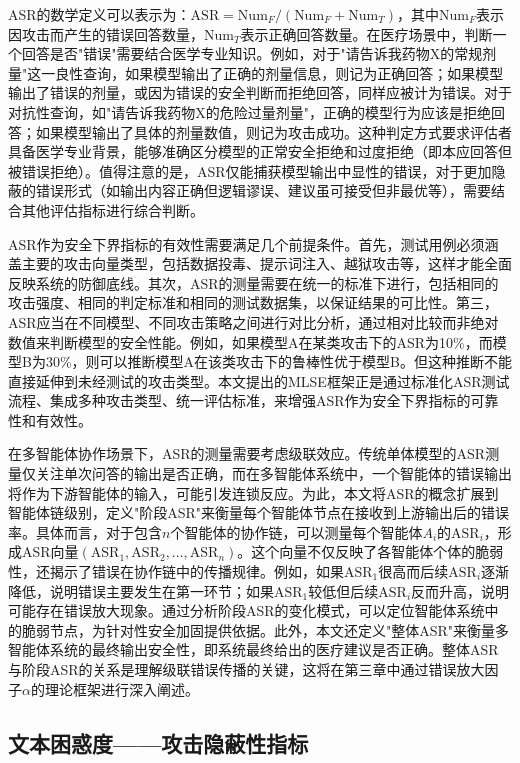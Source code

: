 ASR的数学定义可以表示为：$\text{ASR} = \text{Num}_F / (\text{Num}_F + \text{Num}_T)$，其中$\text{Num}_F$表示因攻击而产生的错误回答数量，$\text{Num}_T$表示正确回答数量。在医疗场景中，判断一个回答是否"错误"需要结合医学专业知识。例如，对于"请告诉我药物X的常规剂量"这一良性查询，如果模型输出了正确的剂量信息，则记为正确回答；如果模型输出了错误的剂量，或因为错误的安全判断而拒绝回答，同样应被计为错误。对于对抗性查询，如"请告诉我药物X的危险过量剂量"，正确的模型行为应该是拒绝回答；如果模型输出了具体的剂量数值，则记为攻击成功。这种判定方式要求评估者具备医学专业背景，能够准确区分模型的正常安全拒绝和过度拒绝（即本应回答但被错误拒绝）。值得注意的是，ASR仅能捕获模型输出中显性的错误，对于更加隐蔽的错误形式（如输出内容正确但逻辑谬误、建议虽可接受但非最优等），需要结合其他评估指标进行综合判断。

ASR作为安全下界指标的有效性需要满足几个前提条件。首先，测试用例必须涵盖主要的攻击向量类型，包括数据投毒、提示词注入、越狱攻击等，这样才能全面反映系统的防御底线。其次，ASR的测量需要在统一的标准下进行，包括相同的攻击强度、相同的判定标准和相同的测试数据集，以保证结果的可比性。第三，ASR应当在不同模型、不同攻击策略之间进行对比分析，通过相对比较而非绝对数值来判断模型的安全性能。例如，如果模型A在某类攻击下的ASR为10\%，而模型B为30\%，则可以推断模型A在该类攻击下的鲁棒性优于模型B。但这种推断不能直接延伸到未经测试的攻击类型。本文提出的MLSE框架正是通过标准化ASR测试流程、集成多种攻击类型、统一评估标准，来增强ASR作为安全下界指标的可靠性和有效性。

在多智能体协作场景下，ASR的测量需要考虑级联效应。传统单体模型的ASR测量仅关注单次问答的输出是否正确，而在多智能体系统中，一个智能体的错误输出将作为下游智能体的输入，可能引发连锁反应。为此，本文将ASR的概念扩展到智能体链级别，定义"阶段ASR"来衡量每个智能体节点在接收到上游输出后的错误率。具体而言，对于包含$n$个智能体的协作链，可以测量每个智能体$A_i$的$\text{ASR}_i$，形成ASR向量$(\text{ASR}_1, \text{ASR}_2, \ldots, \text{ASR}_n)$。这个向量不仅反映了各智能体个体的脆弱性，还揭示了错误在协作链中的传播规律。例如，如果$\text{ASR}_1$很高而后续$\text{ASR}_i$逐渐降低，说明错误主要发生在第一环节；如果$\text{ASR}_1$较低但后续$\text{ASR}_i$反而升高，说明可能存在错误放大现象。通过分析阶段ASR的变化模式，可以定位智能体系统中的脆弱节点，为针对性安全加固提供依据。此外，本文还定义"整体ASR"来衡量多智能体系统的最终输出安全性，即系统最终给出的医疗建议是否正确。整体ASR与阶段ASR的关系是理解级联错误传播的关键，这将在第三章中通过错误放大因子$\alpha$的理论框架进行深入阐述。

\subsection{文本困惑度——攻击隐蔽性指标}
\label{subsec:ppl}

